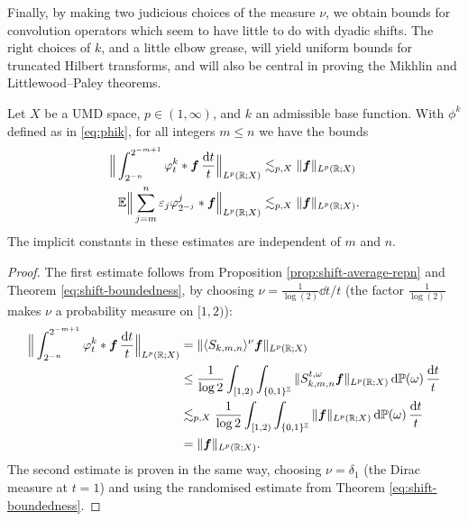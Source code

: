 Finally, by making two judicious choices of the measure $\nu$, we obtain bounds for convolution operators which seem to have little to do with dyadic shifts.
The right choices of $k$, and a little elbow grease, will yield uniform bounds for truncated Hilbert transforms, and will also be central in proving the Mikhlin and Littlewood--Paley theorems. 

\begin{cor}\label{cor:intop-bounds}
  Let $X$ be a UMD space, $p \in (1,\infty)$, and $k$ an admissible base function.
  With $\phi^{k}$ defined as in \eqref{eq:phik}, for all integers $m \leq n$ we have the bounds
  \begin{equation*}
    \begin{aligned}
      \Big\| \int_{2^{-n}}^{2^{-m+1}} \varphi_{t}^{k} \ast \bm{f} \, \frac{\mathrm{d} t}{t} \Big\|_{L^p(\mathbb{R};X)} &\lesssim_{p,X} \|\bm{f}\|_{L^p(\mathbb{R};X)} \\
      \mathbb{E} \Big\| \sum_{j = m}^{n} \varepsilon_{j} \varphi_{2^{-j}}^{j} \ast \bm{f} \Big\|_{L^p(\mathbb{R};X)} &\lesssim_{p,X} \|\bm{f}\|_{L^p(\mathbb{R};X)}.
    \end{aligned}
  \end{equation*}
  The implicit constants in these estimates are independent of $m$ and $n$.
\end{cor}

\begin{proof}
  The first estimate follows from Proposition \ref{prop:shift-average-repn} and Theorem \ref{eq:shift-boundedness}, by choosing $\nu = \frac{1}{\log(2)}\dd t/t$ (the factor $\frac{1}{\log(2)}$ makes $\nu$ a probability measure on $[1,2)$):
  \begin{equation*}
    \begin{aligned}
      \Big\| \int_{2^{-n}}^{2^{-m+1}} \varphi_{t}^{k} \ast \bm{f} \, \frac{\mathrm{d} t}{t} \Big\|_{L^p(\mathbb{R};X)}
      &= \| \langle S_{k,m,n} \rangle^{\nu} \bm{f} \|_{L^p(\mathbb{R};X)} \\
      &\leq \frac{1}{\log 2}\int_{[1,2)} \int_{\{0,1\}^{\mathbb{Z}}} \|S_{k,m,n}^{t,\omega} \bm{f} \|_{L^p(\mathbb{R};X)} \, \mathrm{d}\mathbb{P}(\omega) \, \frac{\mathrm{d} t}{t} \\
      &\lesssim_{p,X} \frac{1}{\log 2} \int_{[1,2)} \int_{\{0,1\}^{\mathbb{Z}}} \| \bm{f} \|_{L^p(\mathbb{R};X)} \, \mathrm{d}\mathbb{P}(\omega) \, \frac{\mathrm{d} t}{t} \\
      &= \|\bm{f}\|_{L^p(\mathbb{R};X)}.
    \end{aligned}
  \end{equation*}
  The second estimate is proven in the same way, choosing $\nu = \delta_{1}$ (the Dirac measure at $t=1$) and using the randomised estimate from Theorem \ref{eq:shift-boundedness}.
\end{proof}

